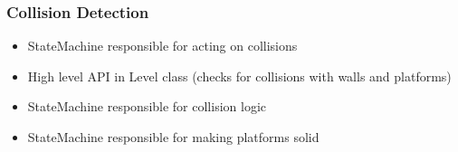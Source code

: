 \begin{frame}
    \frametitle{Collision Detection}
    \begin{itemize}
        \item StateMachine responsible for acting on collisions
        \item High level API in Level class (checks for collisions with walls and platforms)
        \item StateMachine responsible for collision logic
        \item StateMachine responsible for making platforms solid
    \end{itemize}
\end{frame}
